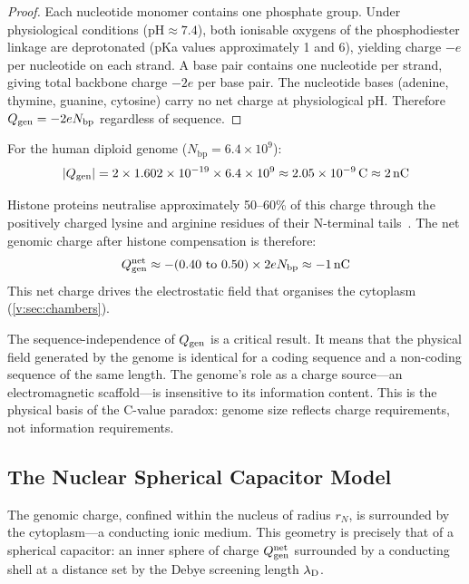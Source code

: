 \begin{proof}
Each nucleotide monomer contains one phosphate group. Under physiological conditions ($\mathrm{pH} \approx 7.4$), both ionisable oxygens of the phosphodiester linkage are deprotonated (pKa values approximately 1 and 6), yielding charge $-e$ per nucleotide on each strand. A base pair contains one nucleotide per strand, giving total backbone charge $-2e$ per base pair. The nucleotide bases (adenine, thymine, guanine, cytosine) carry no net charge at physiological pH. Therefore $Q_{\mathrm{gen}} = -2e N_{\mathrm{bp}}$ regardless of sequence.
\end{proof}

For the human diploid genome ($N_{\mathrm{bp}} = 6.4 \times 10^9$):
\begin{equation}
  \abs{Q_{\mathrm{gen}}} = 2 \times 1.602 \times 10^{-19} \times 6.4 \times 10^9 \approx 2.05 \times 10^{-9}\,\mathrm{C} \approx 2\,\mathrm{nC}
\end{equation}

Histone proteins neutralise approximately 50--60\% of this charge through the positively charged lysine and arginine residues of their N-terminal tails~\cite{Luger1997,Hansen2002}. The net genomic charge after histone compensation is therefore:
\begin{equation}
  Q_{\mathrm{gen}}^{\mathrm{net}} \approx -(0.40\text{ to }0.50) \times 2e N_{\mathrm{bp}} \approx -1\,\mathrm{nC}
  \label{v:eq:net_genome_charge}
\end{equation}
This net charge drives the electrostatic field that organises the cytoplasm (\cref{v:sec:chambers}).

\begin{remark}
The sequence-independence of $Q_{\mathrm{gen}}$ is a critical result. It means that the physical field generated by the genome is identical for a coding sequence and a non-coding sequence of the same length. The genome's role as a charge source---an electromagnetic scaffold---is insensitive to its information content. This is the physical basis of the C-value paradox: genome size reflects charge requirements, not information requirements.
\end{remark}

\subsection{The Nuclear Spherical Capacitor Model}

The genomic charge, confined within the nucleus of radius $r_N$, is surrounded by the cytoplasm---a conducting ionic medium. This geometry is precisely that of a spherical capacitor: an inner sphere of charge $Q_{\mathrm{gen}}^{\mathrm{net}}$ surrounded by a conducting shell at a distance set by the Debye screening length $\lambda_{\mathrm{D}}$.

